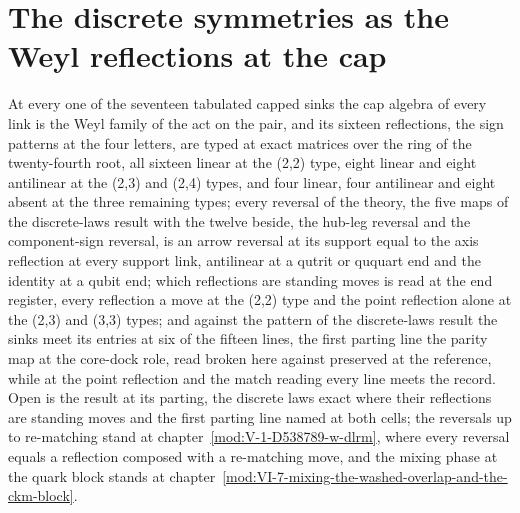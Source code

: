 \section{The discrete symmetries as the Weyl reflections at the cap}\label{mod:III-6-D538473-w-mwey}
\begin{chwall}\label{box:III-6-D538473-w-mwey:1}
At every one of the seventeen tabulated capped sinks the cap algebra of every link is the Weyl family of the act on the pair, and its sixteen reflections, the sign patterns at the four letters, are typed at exact matrices over the ring of the twenty-fourth root, all sixteen linear at the (2,2) type, eight linear and eight antilinear at the (2,3) and (2,4) types, and four linear, four antilinear and eight absent at the three remaining types; every reversal of the theory, the five maps of the discrete-laws result with the twelve beside, the hub-leg reversal and the component-sign reversal, is an arrow reversal at its support equal to the axis reflection at every support link, antilinear at a qutrit or ququart end and the identity at a qubit end; which reflections are standing moves is read at the end register, every reflection a move at the (2,2) type and the point reflection alone at the (2,3) and (3,3) types; and against the pattern of the discrete-laws result the sinks meet its entries at six of the fifteen lines, the first parting line the parity map at the core-dock role, read broken here against preserved at the reference, while at the point reflection and the match reading every line meets the record.
Open is the result at its parting, the discrete laws exact where their reflections are standing moves and the first parting line named at both cells; the reversals up to re-matching stand at chapter~\ref{mod:V-1-D538789-w-dlrm}, where every reversal equals a reflection composed with a re-matching move, and the mixing phase at the quark block stands at chapter~\ref{mod:VI-7-mixing-the-washed-overlap-and-the-ckm-block}.
\end{chwall}
